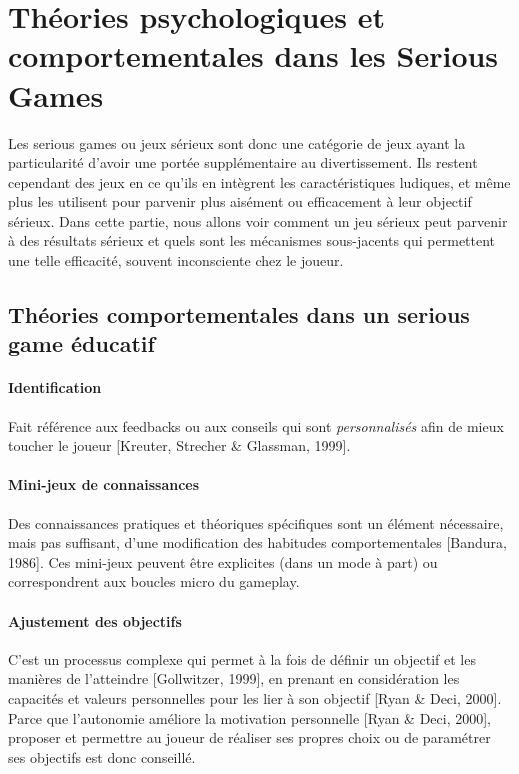 \section{Théories psychologiques et comportementales dans les Serious Games}
\label{part_theories}
Les serious games ou jeux sérieux sont donc une catégorie de jeux ayant la particularité d'avoir une portée supplémentaire au divertissement. Ils restent cependant des jeux en ce qu'ils en intègrent les caractéristiques ludiques, et même plus les utilisent pour parvenir plus aisément ou efficacement à leur objectif sérieux. Dans cette partie, nous allons voir comment un jeu sérieux  peut parvenir à des résultats sérieux et quels sont les mécanismes sous-jacents qui permettent une telle efficacité, souvent inconsciente chez le joueur.

		\subsection{Théories comportementales dans un serious game éducatif}
			\paragraph{Identification \\ \quad}
Fait référence aux feedbacks ou aux conseils qui sont \emph{personnalisés} afin de mieux toucher le joueur [Kreuter, Strecher \& Glassman, 1999]. 
			\paragraph{Mini-jeux de connaissances \\ \quad}
Des connaissances pratiques et théoriques spécifiques sont un élément nécessaire, mais pas suffisant, d’une modification des habitudes comportementales [Bandura, 1986]. Ces mini-jeux peuvent être explicites (dans un mode à part) ou correspondrent aux boucles micro du gameplay.
			\paragraph{Ajustement des objectifs \\ \quad}
C’est un processus complexe qui permet à la fois de définir un objectif et les manières de l’atteindre [Gollwitzer, 1999], en prenant en considération les capacités et valeurs personnelles pour les lier à son objectif [Ryan \& Deci, 2000]. Parce que l’autonomie améliore la motivation personnelle [Ryan \& Deci, 2000], proposer et permettre au joueur de réaliser ses propres choix ou de paramétrer ses objectifs est donc conseillé.
